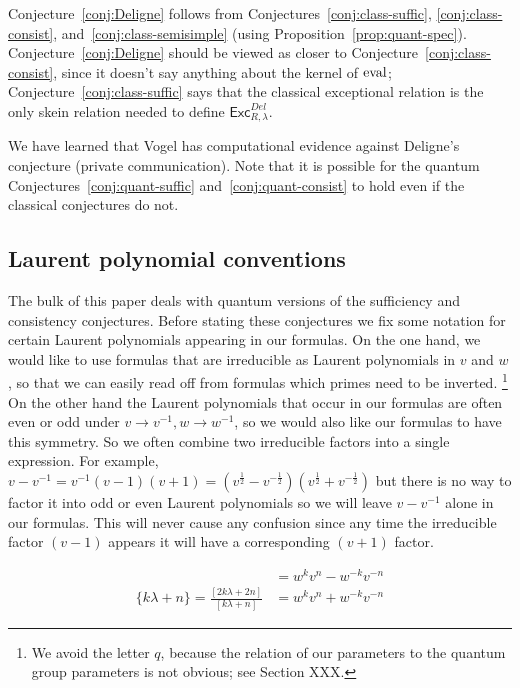 \documentclass[12pt]{amsart}
\begin{document}
Conjecture~\ref{conj:Deligne} follows from
Conjectures~\ref{conj:class-suffic}, \ref{conj:class-consist},
and~\ref{conj:class-semisimple} (using
Proposition~\ref{prop:quant-spec}).
Conjecture~\ref{conj:Deligne} should be
viewed as closer to Conjecture~\ref{conj:class-consist}, since it
doesn't say anything about the kernel of $\operatorname{eval}$;
Conjecture~\ref{conj:class-suffic} says that the classical exceptional
relation is the only skein relation needed to define
$\mathsf{Exc}^{Del}_{R,\lambda}$.

\begin{remark}
  We have learned that Vogel has computational evidence against
  Deligne's conjecture (private communication). Note that it
  is possible for the quantum
  Conjectures~\ref{conj:quant-suffic} and~\ref{conj:quant-consist} to
  hold even if the classical conjectures do not.
\end{remark}

\subsection{Laurent polynomial conventions}

The bulk of this paper deals with quantum versions of the sufficiency and
consistency conjectures.   Before stating these conjectures we fix some
notation for certain Laurent polynomials appearing in our formulas.  On the
one hand, we would like to use formulas that are irreducible as Laurent
polynomials in $v$ and $w$, so that we can easily read off from formulas which
primes need to be inverted.%
\footnote{We avoid the letter $q$, because the relation of our
  parameters to the quantum group parameters is not obvious; see
  Section XXX.}
On the other hand the Laurent polynomials that
occur in our formulas are often even or odd under $v \rightarrow v^{-1}, w
\rightarrow w^{-1}$, so we would also like our formulas to have this symmetry.
So we often combine two irreducible factors into a single expression.  For
example, $v-v^{-1} = v^{-1}(v-1)(v+1) =
(v^{\frac{1}{2}}-v^{-\frac{1}{2}})(v^{\frac{1}{2}}+v^{-\frac{1}{2}})$ but
there is no way to factor it into odd or even Laurent polynomials so we will
leave $v-v^{-1}$ alone in our formulas.  This will never cause any confusion
since any time the irreducible factor $(v-1)$ appears it will have a
corresponding $(v+1)$ factor.

\begin{align*}
[k\lambda + n] &= w^kv^n - w^{-k}v^{-n}\\
\{k\lambda + n\} = \frac{[2k\lambda + 2n]}{[k\lambda + n]} &= w^k v^n + w^{-k} v^{-n}
\end{align*}
\end{document}

